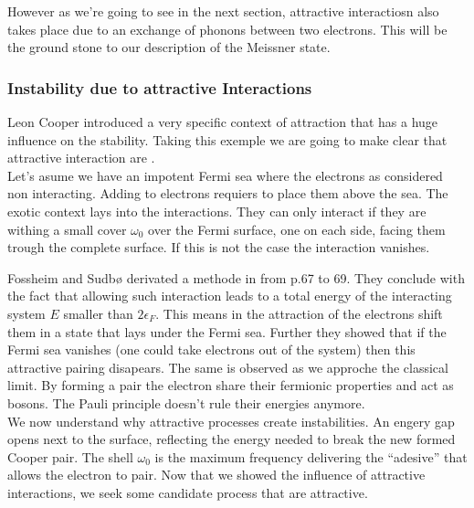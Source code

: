 \documentclass[../main.tex]{subfile}
\begin{document}
However as we're going to see in the next section, attractive interactiosn also takes place due to an exchange of phonons between two electrons. This will be the 
ground stone to our description of the Meissner state.

\subsubsection{Instability due to attractive Interactions}

Leon Cooper introduced a very specific context of attraction that has a huge influence on the stability. Taking this exemple we are going
to make clear that attractive interaction are .\\

Let's asume we have an impotent Fermi sea where the electrons as considered non interacting. Adding to electrons requiers to place them
above the sea. The exotic context lays into the interactions. They can only interact if they are withing a small cover $\omega_0$
over the Fermi surface, one on each side, facing them trough the complete surface. If this is not the case the interaction vanishes.

Fossheim and Sudbø derivated a methode in \cite{FossheimSudbo2004} from p.67 to 69. They conclude with the fact that allowing such
interaction leads to a total energy of the interacting system $E$ smaller than $2 \epsilon_{F}$. This means in the attraction of the electrons
shift them in a state that lays under the Fermi sea. Further they showed that if the Fermi sea vanishes (one could take electrons out of the system) 
then this attractive pairing disapears. The same is observed as we approche the classical limit.
By forming a pair the electron share their fermionic properties and act as bosons. The Pauli principle doesn't rule their energies anymore.\\

We now understand why attractive processes create instabilities. An engery gap opens next to the surface,
reflecting the energy needed to break the new formed Cooper pair. The shell $\omega_0$ is the maximum frequency delivering
the ``adesive'' that allows the electron to pair.
Now that we showed the influence of attractive interactions, we seek some candidate process that are attractive.
\end{document}
